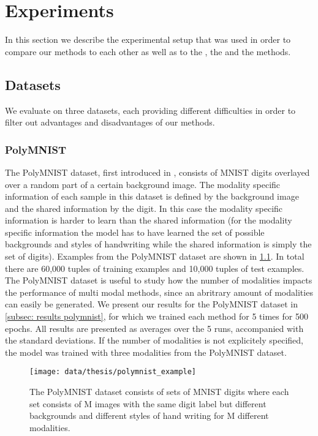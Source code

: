 \chapter{Experiments}
In this section we describe the experimental setup that was used in order to compare our methods to each other as well as to the , the  and the  methods.


\section{Datasets}
We evaluate on three datasets, each providing different difficulties in order to filter out advantages and disadvantages of our methods.

\subsection{PolyMNIST} \label{polymnist}
The PolyMNIST dataset, first introduced in \citep{sutter_multimodal_2020}, consists of MNIST digits overlayed over a random part of a certain background image.
The modality specific information of each sample in this dataset is defined by the background image and the shared information by the digit.
In this case the modality specific information is harder to learn than the shared information (for the modality specific information the model has to have learned the set of possible backgrounds and styles of handwriting while the shared information is simply the set of digits).
Examples from the PolyMNIST dataset are shown in \cref{fig:PolyMNIST}.
In total there are 60,000 tuples of training examples and 10,000 tuples of test examples.
The PolyMNIST dataset is useful to study how the number of modalities impacts the performance of multi modal methods, since an abritrary amount of modalities can easily be generated.
We present our results for the PolyMNIST dataset in \cref{subsec: results polymnist}, for which we trained each method for 5 times for 500 epochs.
All results are presented as averages over the 5 runs, accompanied with the standard deviations.
If the number of modalities is not explicitely specified, the model was trained with three modalities from the PolyMNIST dataset.

\begin{figure}[h!]
    \centering
    \texttt{[image: data/thesis/polymnist\_example]}
    \caption{The PolyMNIST dataset consists of sets of MNIST
    digits where each set consists of M images
    with the same digit label but different backgrounds
    and different styles of hand writing for M different modalities.}
    \label{fig:PolyMNIST}
\end{figure}

